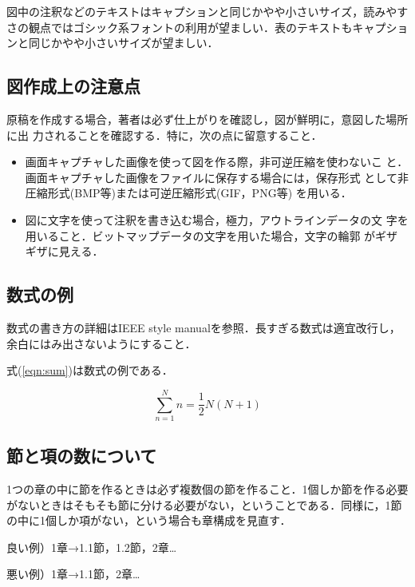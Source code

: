 図中の注釈などのテキストはキャプションと同じかやや小さいサイズ，読みやすさの観点ではゴシック系フォントの利用が望ましい．表のテキストもキャプションと同じかやや小さいサイズが望ましい．

\subsection{図作成上の注意点}
原稿を作成する場合，著者は必ず仕上がりを確認し，図が鮮明に，意図した場所に出
力されることを確認する．特に，次の点に留意すること．
\begin{itemize}

 \item 画面キャプチャした画像を使って図を作る際，非可逆圧縮を使わないこ
       と．画面キャプチャした画像をファイルに保存する場合には，保存形式
       として非圧縮形式(BMP等)または可逆圧縮形式(GIF，PNG等) を用いる．

 \item 図に文字を使って注釈を書き込む場合，極力，アウトラインデータの文
       字を用いること．ビットマップデータの文字を用いた場合，文字の輪郭
       がギザギザに見える．
\end{itemize}

\subsection{数式の例}
数式の書き方の詳細はIEEE style manual\cite{IEEE2014}を参照．長すぎる数式は適宜改行し，余白にはみ出さないようにすること．

式(\ref{eqn:sum})は数式の例である．

\begin{equation}
\sum^{N}_{n=1}n = \frac{1}{2}N(N+1)
\label{eqn:sum}
\end{equation}

\subsection{節と項の数について}
1つの章の中に節を作るときは必ず複数個の節を作ること．1個しか節を作る必要がないときはそもそも節に分ける必要がない，ということである．同様に，1節の中に1個しか項がない，という場合も章構成を見直す．

良い例）1章→1.1節，1.2節，2章…

悪い例）1章→1.1節，2章…